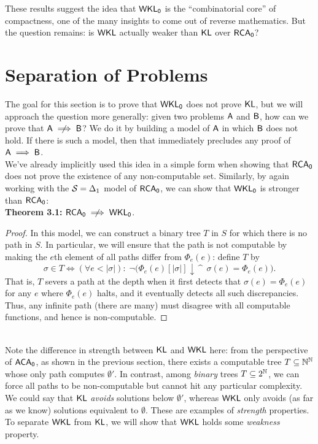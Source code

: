 \documentclass{amsart}
\begin{document}
	These results suggest the idea that $\operatorname{\sf{WKL_0}}$ is the ``combinatorial core'' of compactness, one of the many insights to come out of reverse mathematics. But the question remains: is $\sf{WKL}$ actually weaker than $\operatorname{\sf{KL}}$ over $\operatorname{\sf{RCA_0}}$? 
	
	\newpage
	
	
	
	
	\section{Separation of Problems}
	
	The goal for this section is to prove that $\operatorname{\sf{WKL_0}}$ does not prove $\operatorname{\sf{KL}}$, but we will approach the question more generally: given two problems $\sf{A}$ and $\sf{B}$, how can we prove that $\sf{A}\centernot\implies \sf{B}$? We do it by building a model of $\sf{A}$ in which $\sf{B}$ does not hold. If there is such a model, then that immediately precludes any proof of $\sf{A}\implies \sf{B}$.\\
	
	We've already implicitly used this idea in a simple form when showing that $\operatorname{\sf{RCA_0}}$ does not prove the existence of any non-computable set. Similarly, by again working with the $\mathcal{S}=\Delta_1$ model of $\operatorname{\sf{RCA_0}}$, we can show that $\operatorname{\sf{WKL_0}}$ is stronger than $\operatorname{\sf{RCA_0}}$:\\
	
	\noindent \textbf{Theorem 3.1:} $\RCA\centernot\implies \WKL$.
	\begin{proof}
		In this model, we can construct a binary tree $T$ in $S$ for which there is no path in $S$. In particular, we will ensure that the path is not computable by making the $e$th element of all paths differ from $\Phi_e(e)$: define $T$ by 
		$$
		\sigma \in T \iff (\forall e < |\sigma|):\; \neg\big(\Phi_e(e)[|\sigma|]\downarrow \, \^ \;\, \sigma(e) = \Phi_e(e)\big).
		$$
		That is, $T$ severs a path at the depth when it first detects that $\sigma(e)=\Phi_e(e)$ for any $e$ where $\Phi_e(e)$ halts, and it eventually detects all such discrepancies. Thus, any infinite path (there are many) must disagree with all computable functions, and hence is non-computable.
	\end{proof}\\
	
	Note the difference in strength between $\operatorname{\sf{KL}}$ and $\sf{WKL}$ here: from the perspective of $\operatorname{\sf{ACA_0}}$, as shown in the previous section, there exists a computable tree $T\subseteq \mathbb{N}^{\mathbb{N}}$ whose only path computes $\emptyset'$. In contrast, among \textit{binary} trees $T\subseteq 2^{\mathbb{N}}$, we can force all paths to be non-computable but cannot hit any particular complexity. We could say that $\operatorname{\sf{KL}}$ \textit{avoids} solutions below $\emptyset'$, whereas $\sf{WKL}$ only avoids (as far as we know) solutions equivalent to $\emptyset$. These are examples of \textit{strength} properties. To separate $\sf{WKL}$ from $\operatorname{\sf{KL}}$, we will show that $\sf{WKL}$ holds some \textit{weakness} property.\\
	
\end{document}
